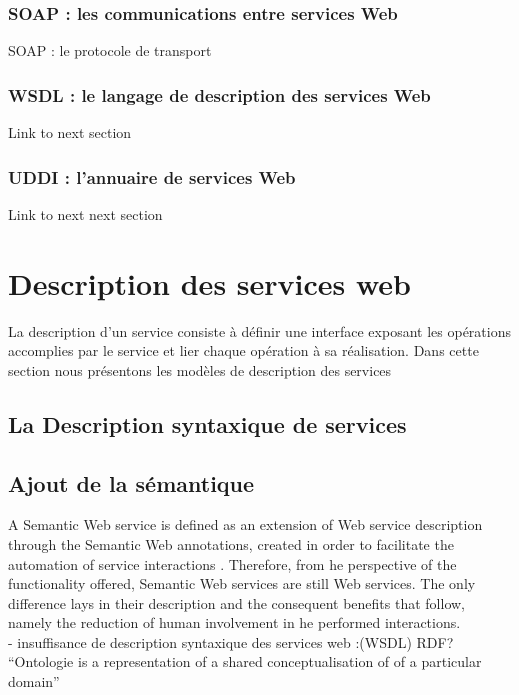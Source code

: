 	 \subsubsection{SOAP : les communications entre services Web } 
	     SOAP : le protocole de transport 
	 \subsubsection{WSDL : le langage de description des services Web}
	     Link to next section
	 \subsubsection{UDDI : l’annuaire de services Web }
	     Link to next next section

\section{Description des services web} 
    La description d’un service consiste à définir une interface exposant les opérations accomplies par le service et 
    lier chaque opération à sa réalisation. Dans cette section nous présentons les modèles de description des services
    	\subsection{La Description syntaxique de services}
        \subsection{Ajout de la sémantique}
	    A Semantic Web service is defined as an extension of Web service description through the Semantic Web annotations,
	    created in order to facilitate the automation of service interactions . Therefore, from 
	    he perspective of the functionality offered, Semantic Web services are still Web services. The only difference lays
	    in their description and the consequent benefits that follow, namely the reduction of human involvement in 
	    he performed interactions.\\

	    - insuffisance de description syntaxique des services web :(WSDL)
	     RDF? \cite{lassila1999resource}\\
	    ``Ontologie is a representation of a shared conceptualisation of of a particular domain'' 

